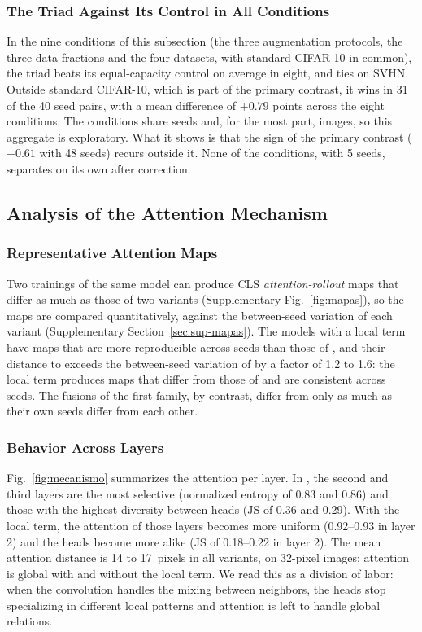 \subsubsection{The Triad Against Its Control in All Conditions}
\label{sec:res-triada-condiciones}
In the nine conditions of this subsection (the three augmentation protocols, the three data fractions and the four datasets, with standard CIFAR-10 in common), the triad beats its equal-capacity control on average in eight, and ties on SVHN. Outside standard CIFAR-10, which is part of the primary contrast, it wins in 31 of the 40 seed pairs, with a mean difference of $+0.79$ points across the eight conditions. The conditions share seeds and, for the most part, images, so this aggregate is exploratory. What it shows is that the sign of the primary contrast ($+0.61$ with 48 seeds) recurs outside it. None of the conditions, with 5 seeds, separates on its own after correction.

\subsection{Analysis of the Attention Mechanism}
\label{sec:res-atencion}

\subsubsection{Representative Attention Maps}
\label{sec:res-mapas}
Two trainings of the same model can produce CLS \emph{attention-rollout} maps that differ as much as those of two variants (Supplementary Fig.~\ref{fig:mapas}), so the maps are compared quantitatively, against the between-seed variation of each variant (Supplementary Section~\ref{sec:sup-mapas}). The models with a local term have maps that are more reproducible across seeds than those of , and their distance to  exceeds the between-seed variation of  by a factor of 1.2 to 1.6: the local term produces maps that differ from those of  and are consistent across seeds. The fusions of the first family, by contrast, differ from  only as much as their own seeds differ from each other.

\subsubsection{Behavior Across Layers}
\label{sec:res-capas}
Fig.~\ref{fig:mecanismo} summarizes the attention per layer. In , the second and third layers are the most selective (normalized entropy of 0.83 and 0.86) and those with the highest diversity between heads (JS of 0.36 and 0.29). With the local term, the attention of those layers becomes more uniform (0.92--0.93 in layer 2) and the heads become more alike (JS of 0.18--0.22 in layer 2). The mean attention distance is 14 to 17~pixels in all variants, on 32-pixel images: attention is global with and without the local term. We read this as a division of labor: when the convolution handles the mixing between neighbors, the heads stop specializing in different local patterns and attention is left to handle global relations.

